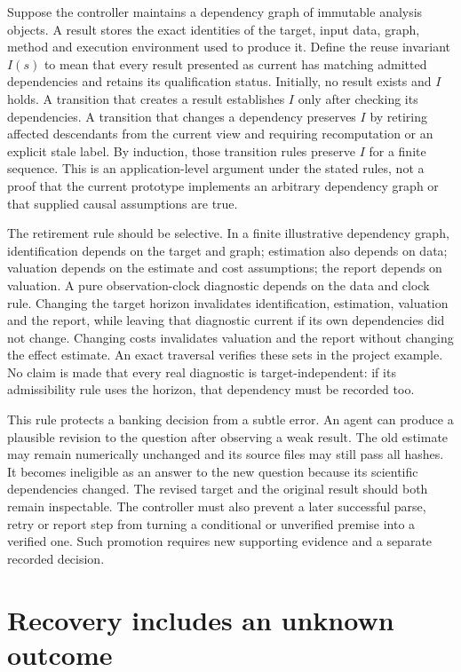Suppose the controller maintains a dependency graph of immutable analysis
objects. A result stores the exact identities of the target, input data,
graph, method and execution environment used to produce it. Define the
reuse invariant $I(s)$ to mean that every result presented as current has
matching admitted dependencies and retains its qualification status.
Initially, no result exists and $I$ holds. A transition that creates a
result establishes $I$ only after checking its dependencies. A transition
that changes a dependency preserves $I$ by retiring affected descendants
from the current view and requiring recomputation or an explicit stale
label. By induction, those transition rules preserve $I$ for a finite
sequence. This is an application-level argument under the stated rules,
not a proof that the current prototype implements an arbitrary dependency
graph or that supplied causal assumptions are true.\cite{exec14_l6_exact}

The retirement rule should be selective. In a finite illustrative dependency
graph, identification depends on the target and graph; estimation also
depends on data; valuation depends on the estimate and cost assumptions;
the report depends on valuation. A pure observation-clock diagnostic depends
on the data and clock rule. Changing the target horizon invalidates
identification, estimation, valuation and the report, while leaving that
diagnostic current if its own dependencies did not change. Changing costs
invalidates valuation and the report without changing the effect estimate.
An exact traversal verifies these sets in the project example. No claim is
made that every real diagnostic is target-independent: if its admissibility
rule uses the horizon, that dependency must be recorded too.
\cite{exec14_l6_exact}

This rule protects a banking decision from a subtle error. An agent can
produce a plausible revision to the question after observing a weak result.
The old estimate may remain numerically unchanged and its source files may
still pass all hashes. It becomes ineligible as an answer to the new
question because its scientific dependencies changed. The revised target
and the original result should both remain inspectable. The controller
must also prevent a later successful parse, retry or report step from
turning a conditional or unverified premise into a verified one. Such
promotion requires new supporting evidence and a separate recorded decision.

\section{Recovery includes an unknown outcome}

